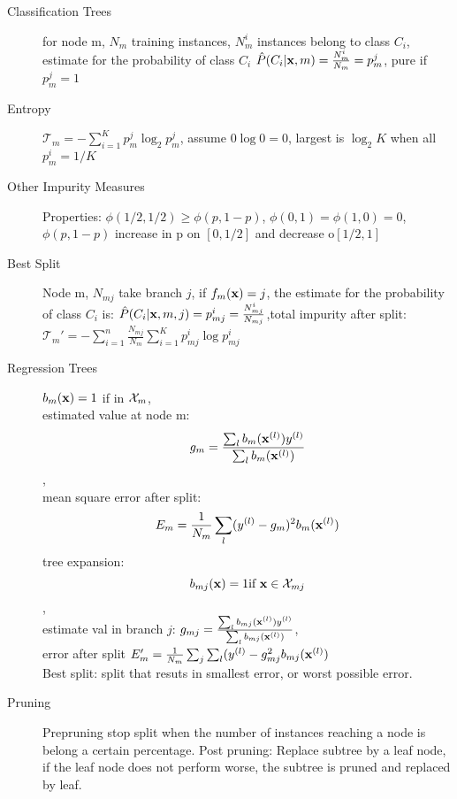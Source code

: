 \begin{description}
    \item[Classification Trees] for node m, $N_m$ training instances, $N_m^i$
        instances belong to class $C_i$, estimate for the probability of class
        $C_i$ $\hat{P}(C_i|\mathbf{x}, m) = \frac{N^i_m}{N_m} = p^j_m$, pure if $p^j_m
        = 1$
    \item[Entropy] $\mathcal{T}_m = - \sum_{i=1}^K p_m^j\log_2p_m^j$, assume $0\log 0
        =0$, largest is $\log_2 K$ when all $p^i_m = 1/K$
    \item[Other Impurity Measures] Properties: $\phi(1/2,1/2) \geq \phi(p,1-p)$,
        $\phi(0,1) = \phi(1,0) = 0$, $\phi(p,1-p)$ increase in p on $[0, 1/2]$
        and decrease o$[1/2,1]$
    \item[Best Split] Node m, $N_{mj}$ take branch $j$, if $f_m(\mathbf{x})=j$, the
        estimate for the probability of class $C_i$ is: $\hat{P}(C_i|\mathbf{x}, m, j)
        = p^i_{mj} = \frac{N^i_{mj}}{N_{mj}}$,total impurity after split:\\
        $ \mathcal{T}_m' = -\sum_{i=1}^n\frac{N_{mj}}{N_m}\sum_{i=1}^Kp^i_{mj}\log
        p^i_{mj} $
    \item[Regression Trees] $b_m(\mathbf{x}) = 1$ if in $\mathcal{X}_m$, \\estimated value at
        node m: \[g_m = \frac{\sum_l b_m(\mathbf{x}^{(l)})y^{(l)}}{\sum_l b_m(\mathbf{x}^{(l)})}\], \\mean
        square
        error after split: \[E_m = \frac{1}{N_m}\sum_l (y^{(l)} - g_m)^2 b_m
        (\mathbf{x}^{(l)})\]
        tree expansion: \[b_{mj}(\mathbf{x}) = 1 \mbox{if } \mathbf{x} \in \mathcal{X}_{mj}\], \\estimate
        val in branch $j$: $g_{mj} = \frac{\sum_l b_{mj}(\mathbf{x}^{(l)})y^{(l)}}{\sum_l
            b_{mj}(\mathbf{x}^{(l)})}$, \\error after split $E_m' =
            \frac{1}{N_m}\sum_j\sum_l(y^{(l)} - g_{mj}^2b_{mj}(\mathbf{x}^{(l)})$\\
        Best split: split that resuts in smallest error, or worst possible
        error.
    \item[Pruning] Prepruning stop split when the number of instances reaching a
        node is belong a certain percentage. Post pruning: Replace subtree by a
        leaf node, if the leaf node does not perform worse, the subtree is pruned
        and replaced by leaf.

\end{description}
